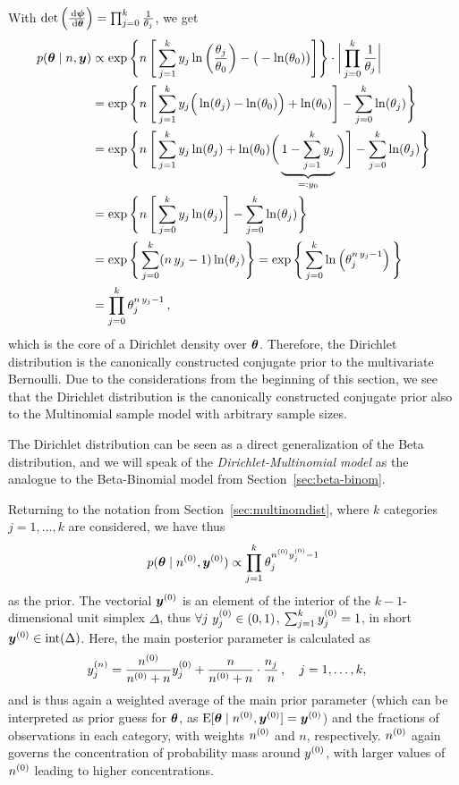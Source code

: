 With $\det\left(\frac{\,\mathrm{d}\boldsymbol{\psi}}{\,\mathrm{d}\boldsymbol{\theta}}\right) = \prod_{j=0}^k \frac{1}{\theta_j}$, we get
\begin{align*}
\allowdisplaybreaks
p(\btheta\mid n,\vec{y})
 &\propto \exp\Bigg\{n\, \Bigg[ \sum_{j=1}^k y_j \ln\bigg(\frac{\theta_j}{\theta_0}\bigg) - \big(-\ln(\theta_0)\big) \Bigg] \Bigg\}
  \cdot \bigg| \prod_{j=0}^k \frac{1}{\theta_j} \bigg| \\
 &=       \exp\Bigg\{n\, \Bigg[ \sum_{j=1}^k y_j \Big(\ln(\theta_j)-\ln(\theta_0)\Big) + \ln(\theta_0) \Bigg]
                         - \sum_{j=0}^k \ln(\theta_j) \Bigg\} \\
 &=       \exp\Bigg\{n\, \Bigg[ \sum_{j=1}^k y_j \ln(\theta_j) + \ln(\theta_0) \bigg(\underbrace{1 - \sum_{j=1}^k  y_j}_{=: y_0}\bigg) \Bigg]
                         - \sum_{j=0}^k \ln(\theta_j) \Bigg\} \\
 &=       \exp\Bigg\{n\, \Bigg[ \sum_{j=0}^k y_j \ln(\theta_j) \Bigg] - \sum_{j=0}^k \ln(\theta_j) \Bigg\} \\
 &=       \exp\Bigg\{\sum_{j=0}^k (n\,y_j -1 ) \ln(\theta_j) \Bigg\}
  =       \exp\Bigg\{\sum_{j=0}^k \ln\left(\theta_j^{n\,y_j -1}\right) \Bigg\}\\
 &= \prod_{j=0}^k \theta_j^{n\,y_j - 1}\,,
\end{align*}
which is the core of a Dirichlet density over $\boldsymbol{\theta}$.
Therefore, the Dirichlet distribution is the canonically constructed conjugate prior to the multivariate Bernoulli.
Due to the considerations from the beginning of this section,
we see that the Dirichlet distribution is the canonically constructed conjugate prior
also to the Multinomial sample model with arbitrary sample sizes.

The Dirichlet distribution can be seen as a direct generalization of the Beta distribution,
and we will speak of the \emph{Dirichlet-Multinomial model}
as the analogue to the Beta-Binomial model from Section~\ref{sec:beta-binom}.

Returning to the notation from Section~\ref{sec:multinomdist},
where $k$ categories $j=1,\ldots,k$ are considered, 
we have thus
\begin{align}
\label{eq:dirichlet-prior}
p(\boldsymbol{\theta}\mid n^{(0)},{\bm y}^{(0)}) \propto \prod_{j=1}^k \theta_j^{n^{(0)}y^{(0)}_j-1}
\end{align}
as the prior.
The vectorial ${\bm y}^{(0)}$ is an element of the interior of the $k-1$-dimensional unit simplex $\Delta$,
thus $\forall j \ y^{(0)}_j \in (0,1)$, $\sum_{j=1}^k y^{(0)}_j = 1$, in short ${\bm y}^{(0)} \in \text{int}(\Delta)$.
Here, the main posterior parameter is calculated as
\begin{align*}
y^{(n)}_j &= \frac{n^{(0)}}{n^{(0)}+n} y^{(0)}_j + \frac{n}{n^{(0)}+n} \cdot \frac{n_j}{n}\,,\quad j = 1,\ldots, k,
\end{align*}
and is thus again a weighted average of the main prior parameter
(which can be interpreted as prior guess for $\boldsymbol{\theta}$, as $\operatorname{E}[\boldsymbol{\theta}\mid n^{(0)},{\bm y}^{(0)}] = {\bm y}^{(0)}$)
and the fractions of observations in each category,
with weights $n^{(0)}$ and $n$, respectively.
$n^{(0)}$ again governs the concentration of probability mass around $y^{(0)}$,
with larger values of $n^{(0)}$ leading to higher concentrations.

